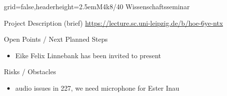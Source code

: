 \documentclass[english]{kiesgrube}
\begin{document}
\begin{poster}{grid=false,headerheight=2.5em}{}{M4k8/40 Wissenschaftsseminar}{}{}
\begin{posterbox}[name=description,column=1,row=0]{Project Description (brief)}
\url{https://lecture.sc.uni-leipzig.de/b/hoe-6ye-ntx}
\end{posterbox}
\begin{posterbox}[name=open,column=0,below=event]{Open Points / Next Planned Steps}
\small
\begin{itemize}
\item Eike Felix Linnebank has been invited to present
\end{itemize}
\end{posterbox}
\begin{posterbox}[name=risks,column=1,below=event]{Risks / Obstacles}
\begin{itemize}
\item audio issues in 227, we need microphone for Ester Inau
\end{itemize}
\end{posterbox}
\end{poster}
\end{document}
